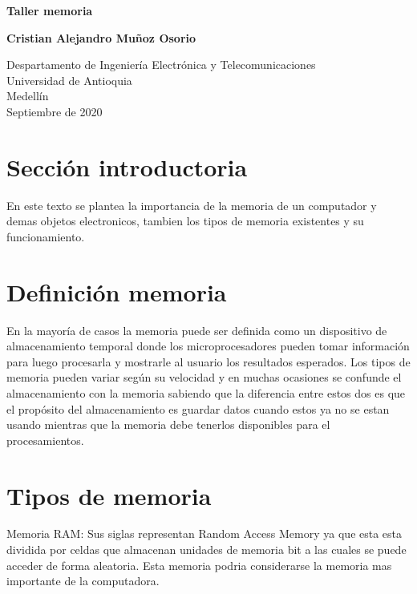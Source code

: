 \documentclass{article}
\begin{document}
\begin{titlepage}
    \begin{center}
        \vspace*{1cm}
            
        \Huge
        \textbf{Taller memoria}
            
        \vspace{0.5cm}
        \LARGE

            
        \vspace{1.5cm}
            
        \textbf{Cristian Alejandro Muñoz Osorio}
            
        \vfill
            
        \vspace{0.8cm}
            
        \Large
        Despartamento de Ingeniería Electrónica y Telecomunicaciones\\
        Universidad de Antioquia\\
        Medellín\\
        Septiembre de 2020
            
    \end{center}
\end{titlepage}

\tableofcontents

\section{Sección introductoria}
En este texto se plantea la importancia de la memoria de un computador y demas objetos electronicos, tambien los tipos de memoria existentes y su funcionamiento.

\section{Definición memoria}
En la mayoría de casos la memoria puede ser definida como un dispositivo de almacenamiento temporal donde los microprocesadores pueden tomar información para luego procesarla y mostrarle al usuario los resultados esperados. Los tipos de memoria pueden variar según su velocidad y en muchas ocasiones se confunde el almacenamiento con la memoria sabiendo que la diferencia entre estos dos es que el propósito del almacenamiento es guardar datos cuando estos ya no se estan usando mientras que la memoria debe tenerlos disponibles para el procesamientos.

\section{Tipos de memoria}
Memoria RAM: Sus siglas representan Random Access Memory ya que esta esta dividida por celdas que almacenan unidades de memoria bit a las cuales se puede acceder de forma aleatoria. Esta memoria podria considerarse la memoria mas importante de la computadora.
\end{document}

